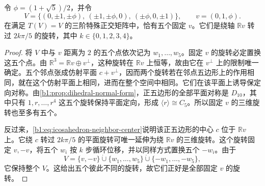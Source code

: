 \begin{lemma}[固定一个正二十面体顶点的旋转]\label{b1:lem:icosahedral-vertex-stabilizer}
	令 \(\phi=(1+\sqrt5)/2\)，并令
	\[
		V=\bigl\{(0,\pm1,\pm\phi),\ (\pm1,\pm\phi,0),\
		(\pm\phi,0,\pm1)\bigr\}, \qquad v=(0,1,\phi).
	\]
	在满足 \(T(V)=V\) 的三阶特殊正交矩阵中，恰有五个固定 \(v\)。它们是绕轴 \(\mathbb Rv\) 转过 \(2k\pi/5\) 的旋转，其中 \(k\in\{0,1,2,3,4\}\)。
\end{lemma}
\begin{proof}
	将 \(V\) 中与 \(v\) 距离为 \(2\) 的五个点依次记为 \(w_1,\ldots,w_5\)。固定 \(v\) 的旋转必定置换这五个点。由 \(\mathbb R^3=\mathbb Rv\oplus v^\perp\)，这种旋转在 \(\mathbb Rv\) 上恒等，故由它在 \(v^\perp\) 上的限制唯一确定。五个邻点张成仿射平面 \(c+v^\perp\)，因而两个旋转若在邻点五边形上的作用相同，就在这个仿射平面上相同，进而在整个空间中相同。它们在该平面上诱导保定向对称。由\cref{b1:prop:dihedral-normal-form}，正五边形的全部平面对称是 \(D_{10}\)，其中只有 \(1,r,\ldots,r^4\) 这五个旋转保持平面定向，形成 \(\langle r\rangle\cong C_5\)。所以固定 \(v\) 的三维旋转也至多有五个。

	反过来，\eqref{b1:eq:icosahedron-neighbor-center}说明该正五边形的中心 \(c\) 位于 \(\mathbb Rv\) 上。它绕 \(c\) 转过 \(2k\pi/5\) 的平面旋转可唯一延伸为绕 \(\mathbb Rv\) 的三维旋转。这个旋转固定 \(v,-v\)，将五个 \(w_i\) 按 \(k\) 步循环位移，并以同样方式置换五个 \(-w_i\)。由于
	\[
		V=\{v,-v\}\mathbin{\dot\cup}\{w_1,\ldots,w_5\} \mathbin{\dot\cup}\{-w_1,\ldots,-w_5\},
	\]
	它保持整个 \(V\)。这给出五个彼此不同的旋转，故它们正好是全部固定 \(v\) 的旋转。
\end{proof}

